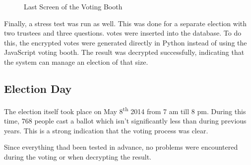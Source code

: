 \begin{figure}
  \caption{Last Screen of the Voting Booth}
  \label{fig:app:booth_submit}
\end{figure}

\par Finally, a stress test was run as well. This was done for a separate election with two trustees and three questions.  votes were inserted into the database. To do this, the encrypted votes were generated directly in Python instead of using the JavaScript voting booth. The result was decrypted successfully, indicating that the system can manage an election of that size.

\subsection{Election Day}

The election itself took place on May 8\textsuperscript{th} 2014 from 7 am till 8 pm. During this time, 768 people cast a ballot which isn't significantly less than during previous years. This is a strong indication that the voting process was clear.

\par Since everything thad been tested in advance, no problems were encountered during the voting or when decrypting the result.
